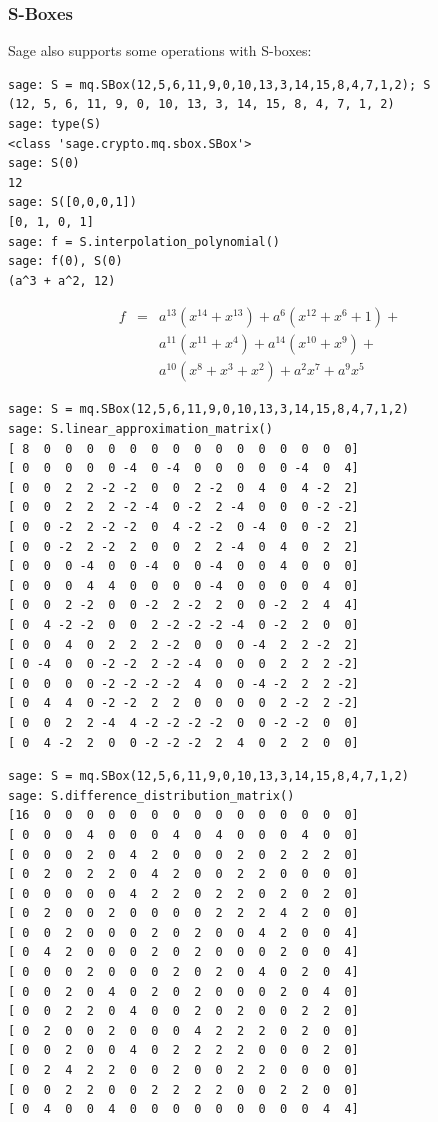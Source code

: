 \documentclass[10pt]{beamer}
\begin{document}
\begin{frame}
\frametitle{S-Boxes}

Sage also supports some operations with S-boxes:

\begin{lstlisting}
sage: S = mq.SBox(12,5,6,11,9,0,10,13,3,14,15,8,4,7,1,2); S
(12, 5, 6, 11, 9, 0, 10, 13, 3, 14, 15, 8, 4, 7, 1, 2)
sage: type(S)
<class 'sage.crypto.mq.sbox.SBox'>
sage: S(0)
12
sage: S([0,0,0,1])
[0, 1, 0, 1]
sage: f = S.interpolation_polynomial()
sage: f(0), S(0)
(a^3 + a^2, 12)
\end{lstlisting}


\begin{eqnarray*}
f &=& a^{13}(x^{14} + x^{13}) + a^{6}(x^{12} + x^{6} + 1) + \\
 & &  a^{11}(x^{11} + x^4) + a^{14}(x^{10} + x^{9}) + \\
 & &  a^{10}(x^{8} + x^{3} + x^{2}) + a^{2}x^{7} + a^{9}x^{5}
\end{eqnarray*}

\framebreak

\begin{lstlisting}
sage: S = mq.SBox(12,5,6,11,9,0,10,13,3,14,15,8,4,7,1,2)
sage: S.linear_approximation_matrix()
[ 8  0  0  0  0  0  0  0  0  0  0  0  0  0  0  0]
[ 0  0  0  0  0 -4  0 -4  0  0  0  0  0 -4  0  4]
[ 0  0  2  2 -2 -2  0  0  2 -2  0  4  0  4 -2  2]
[ 0  0  2  2  2 -2 -4  0 -2  2 -4  0  0  0 -2 -2]
[ 0  0 -2  2 -2 -2  0  4 -2 -2  0 -4  0  0 -2  2]
[ 0  0 -2  2 -2  2  0  0  2  2 -4  0  4  0  2  2]
[ 0  0  0 -4  0  0 -4  0  0 -4  0  0  4  0  0  0]
[ 0  0  0  4  4  0  0  0  0 -4  0  0  0  0  4  0]
[ 0  0  2 -2  0  0 -2  2 -2  2  0  0 -2  2  4  4]
[ 0  4 -2 -2  0  0  2 -2 -2 -2 -4  0 -2  2  0  0]
[ 0  0  4  0  2  2  2 -2  0  0  0 -4  2  2 -2  2]
[ 0 -4  0  0 -2 -2  2 -2 -4  0  0  0  2  2  2 -2]
[ 0  0  0  0 -2 -2 -2 -2  4  0  0 -4 -2  2  2 -2]
[ 0  4  4  0 -2 -2  2  2  0  0  0  0  2 -2  2 -2]
[ 0  0  2  2 -4  4 -2 -2 -2 -2  0  0 -2 -2  0  0]
[ 0  4 -2  2  0  0 -2 -2 -2  2  4  0  2  2  0  0]
\end{lstlisting}

\framebreak

\begin{lstlisting}
sage: S = mq.SBox(12,5,6,11,9,0,10,13,3,14,15,8,4,7,1,2)
sage: S.difference_distribution_matrix()
[16  0  0  0  0  0  0  0  0  0  0  0  0  0  0  0]
[ 0  0  0  4  0  0  0  4  0  4  0  0  0  4  0  0]
[ 0  0  0  2  0  4  2  0  0  0  2  0  2  2  2  0]
[ 0  2  0  2  2  0  4  2  0  0  2  2  0  0  0  0]
[ 0  0  0  0  0  4  2  2  0  2  2  0  2  0  2  0]
[ 0  2  0  0  2  0  0  0  0  2  2  2  4  2  0  0]
[ 0  0  2  0  0  0  2  0  2  0  0  4  2  0  0  4]
[ 0  4  2  0  0  0  2  0  2  0  0  0  2  0  0  4]
[ 0  0  0  2  0  0  0  2  0  2  0  4  0  2  0  4]
[ 0  0  2  0  4  0  2  0  2  0  0  0  2  0  4  0]
[ 0  0  2  2  0  4  0  0  2  0  2  0  0  2  2  0]
[ 0  2  0  0  2  0  0  0  4  2  2  2  0  2  0  0]
[ 0  0  2  0  0  4  0  2  2  2  2  0  0  0  2  0]
[ 0  2  4  2  2  0  0  2  0  0  2  2  0  0  0  0]
[ 0  0  2  2  0  0  2  2  2  2  0  0  2  2  0  0]
[ 0  4  0  0  4  0  0  0  0  0  0  0  0  0  4  4]
\end{lstlisting}


\end{frame}
\end{document}
